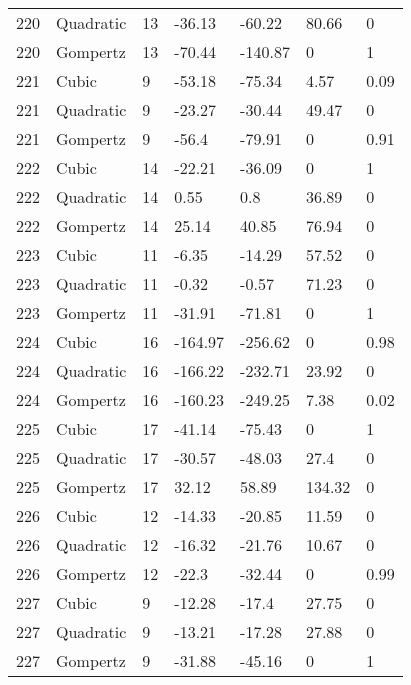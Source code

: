 \documentclass[11pt]{article}
\begin{document}
\begin{center}
\begin{longtable}{lllllll}
    220 & Quadratic & 13              & -36.13  & -60.22  & 80.66   & 0    \\
    220 & Gompertz  & 13              & -70.44  & -140.87 & 0       & 1    \\
    221 & Cubic     & 9               & -53.18  & -75.34  & 4.57    & 0.09 \\
    221 & Quadratic & 9               & -23.27  & -30.44  & 49.47   & 0    \\
    221 & Gompertz  & 9               & -56.4   & -79.91  & 0       & 0.91 \\
    222 & Cubic     & 14              & -22.21  & -36.09  & 0       & 1    \\
    222 & Quadratic & 14              & 0.55    & 0.8     & 36.89   & 0    \\
    222 & Gompertz  & 14              & 25.14   & 40.85   & 76.94   & 0    \\
    223 & Cubic     & 11              & -6.35   & -14.29  & 57.52   & 0    \\
    223 & Quadratic & 11              & -0.32   & -0.57   & 71.23   & 0    \\
    223 & Gompertz  & 11              & -31.91  & -71.81  & 0       & 1    \\
    224 & Cubic     & 16              & -164.97 & -256.62 & 0       & 0.98 \\
    224 & Quadratic & 16              & -166.22 & -232.71 & 23.92   & 0    \\
    224 & Gompertz  & 16              & -160.23 & -249.25 & 7.38    & 0.02 \\
    225 & Cubic     & 17              & -41.14  & -75.43  & 0       & 1    \\
    225 & Quadratic & 17              & -30.57  & -48.03  & 27.4    & 0    \\
    225 & Gompertz  & 17              & 32.12   & 58.89   & 134.32  & 0    \\
    226 & Cubic     & 12              & -14.33  & -20.85  & 11.59   & 0    \\
    226 & Quadratic & 12              & -16.32  & -21.76  & 10.67   & 0    \\
    226 & Gompertz  & 12              & -22.3   & -32.44  & 0       & 0.99 \\
    227 & Cubic     & 9               & -12.28  & -17.4   & 27.75   & 0    \\
    227 & Quadratic & 9               & -13.21  & -17.28  & 27.88   & 0    \\
    227 & Gompertz  & 9               & -31.88  & -45.16  & 0       & 1    \\

\end{longtable}
\end{center}
\end{document}
